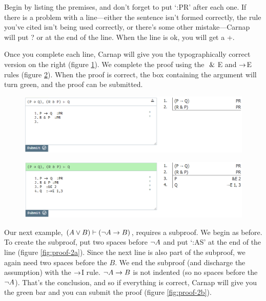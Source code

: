 Begin by listing the premises, and don't forget to put `:PR' after each one. If there is a problem with a line---either the sentence isn't formed correctly, the rule you've cited isn't being used correctly, or there's some other mistake---Carnap will put \textsf{?} or {\selectfont{}\relax}  at the end of the line. When the line is ok, you will get a +.

Once you complete each line, Carnap will give you the typographically correct version on the right (figure \ref{fig:proof-1b}). We complete the proof using the $~\&~$E and $\rightarrow$E rules (figure \ref{fig:proof-1c}). When the proof is correct, the box containing the argument will turn green, and the proof can be submitted. 

\begin{figure}[h]
\includegraphics[width=13cm]{textbook--1b.PNG}
\caption{}
\label{fig:proof-1b}
\end{figure}

\begin{figure}[h]
\includegraphics[width=13cm]{textbook--1c.PNG}
\caption{}
\label{fig:proof-1c}
\end{figure}

Our next example, $(A \vee B) \vdash ({\neg} A \rightarrow B)$, requires a subproof. We begin as before. To create the subproof, put two spaces before ${\neg} A$ and put `:AS' at the end of the line (figure \ref{fig:proof-2a}). Since the next line is also part of the subproof, we again need two spaces before the $B$. We end the subproof (and discharge the assumption) with the $\rightarrow$I rule. ${\neg} A \rightarrow B$ is not indented (so no spaces before the ${\neg} A$). That's the conclusion, and so if everything is correct, Carnap will give you the green bar and you can submit the proof (figure \ref{fig:proof-2b}). 

